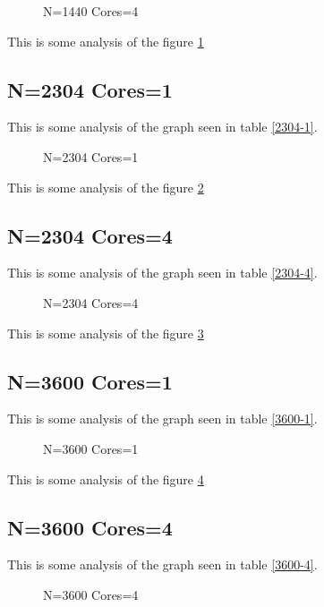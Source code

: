 \documentclass[a4paper]{article}
\begin{document}
\begin{figure}
    
    \caption{N=1440 Cores=4}
    \label{fig:1440_4}
\end{figure}

This is some analysis of the figure \ref{fig:1440_4}

\subsection{N=2304 Cores=1}

This is some analysis of the graph seen in table \ref{2304-1}.

\begin{figure}
    
    \caption{N=2304 Cores=1}
    \label{fig:2304_1}
\end{figure}

This is some analysis of the figure \ref{fig:2304_1}

\subsection{N=2304 Cores=4}

This is some analysis of the graph seen in table \ref{2304-4}.

\begin{figure}
    
    \caption{N=2304 Cores=4}
    \label{fig:2304_4}
\end{figure}

This is some analysis of the figure \ref{fig:2304_4}

\subsection{N=3600 Cores=1}

This is some analysis of the graph seen in table \ref{3600-1}.

\begin{figure}
    
    \caption{N=3600 Cores=1}
    \label{fig:3600_1}
\end{figure}

This is some analysis of the figure \ref{fig:3600_1}

\subsection{N=3600 Cores=4}

This is some analysis of the graph seen in table \ref{3600-4}.

\begin{figure}
    
    \caption{N=3600 Cores=4}
    \label{fig:3600_4}
\end{figure}
\end{document}
